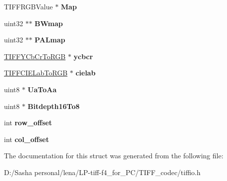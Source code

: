 \begin{DoxyCompactItemize}
\begin{tabbing}
\end{tabbing}\item 
\hypertarget{struct___t_i_f_f_r_g_b_a_image_a8644f69691fc7f5526bceecd1dcc1bba}{}T\+I\+F\+F\+R\+G\+B\+Value $\ast$ {\bfseries Map}\label{struct___t_i_f_f_r_g_b_a_image_a8644f69691fc7f5526bceecd1dcc1bba}

\item 
\hypertarget{struct___t_i_f_f_r_g_b_a_image_ac7d354d0fcdf45521be485f33d41590d}{}uint32 $\ast$$\ast$ {\bfseries B\+Wmap}\label{struct___t_i_f_f_r_g_b_a_image_ac7d354d0fcdf45521be485f33d41590d}

\item 
\hypertarget{struct___t_i_f_f_r_g_b_a_image_a645ebc4bd56884f501fffe5064a28ed6}{}uint32 $\ast$$\ast$ {\bfseries P\+A\+Lmap}\label{struct___t_i_f_f_r_g_b_a_image_a645ebc4bd56884f501fffe5064a28ed6}

\item 
\hypertarget{struct___t_i_f_f_r_g_b_a_image_a40f50aee83ac8097375f9a4ce1efe44a}{}\hyperlink{struct_t_i_f_f_y_cb_cr_to_r_g_b}{T\+I\+F\+F\+Y\+Cb\+Cr\+To\+R\+G\+B} $\ast$ {\bfseries ycbcr}\label{struct___t_i_f_f_r_g_b_a_image_a40f50aee83ac8097375f9a4ce1efe44a}

\item 
\hypertarget{struct___t_i_f_f_r_g_b_a_image_a09c125216db45ed49394581ac25e98f6}{}\hyperlink{struct_t_i_f_f_c_i_e_lab_to_r_g_b}{T\+I\+F\+F\+C\+I\+E\+Lab\+To\+R\+G\+B} $\ast$ {\bfseries cielab}\label{struct___t_i_f_f_r_g_b_a_image_a09c125216db45ed49394581ac25e98f6}

\item 
\hypertarget{struct___t_i_f_f_r_g_b_a_image_ae05a3ca533fb0f57b49b068e461df234}{}uint8 $\ast$ {\bfseries Ua\+To\+Aa}\label{struct___t_i_f_f_r_g_b_a_image_ae05a3ca533fb0f57b49b068e461df234}

\item 
\hypertarget{struct___t_i_f_f_r_g_b_a_image_a04ed10f599f5d8c124dee34ac052c0de}{}uint8 $\ast$ {\bfseries Bitdepth16\+To8}\label{struct___t_i_f_f_r_g_b_a_image_a04ed10f599f5d8c124dee34ac052c0de}

\item 
\hypertarget{struct___t_i_f_f_r_g_b_a_image_aeae883d18a1310f62bc8eba2d0fe7e5d}{}int {\bfseries row\+\_\+offset}\label{struct___t_i_f_f_r_g_b_a_image_aeae883d18a1310f62bc8eba2d0fe7e5d}

\item 
\hypertarget{struct___t_i_f_f_r_g_b_a_image_a7e7925118c20bf4c84959b38aa883a0c}{}int {\bfseries col\+\_\+offset}\label{struct___t_i_f_f_r_g_b_a_image_a7e7925118c20bf4c84959b38aa883a0c}

\end{DoxyCompactItemize}


The documentation for this struct was generated from the following file\+:\begin{DoxyCompactItemize}
\item 
D\+:/\+Sasha personal/lena/\+L\+P-\/tiff-\/f4\+\_\+for\+\_\+\+P\+C/\+T\+I\+F\+F\+\_\+codec/tiffio.\+h\end{DoxyCompactItemize}
